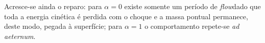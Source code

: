 \vspace{-1em}
\noindent Acresce-se ainda o reparo: para $\alpha = 0$ existe somente um período de \textit{flow}\footnotemark[10] dado que toda a energia cinética é perdida com o choque e a massa pontual permanece, deste modo, pegada à superfície; para $\alpha = 1$ o comportamento repete-se \textit{ad aeternum}\footnotemark[10].

